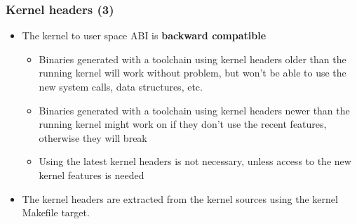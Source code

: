 \begin{frame}
  \frametitle{Kernel headers (3)}
  \begin{itemize}
  \item The kernel to user space ABI is {\bf backward compatible}
    \begin{itemize}
    \item Binaries generated with a toolchain using kernel headers
      older than the running kernel will work without problem, but
      won't be able to use the new system calls, data structures, etc.
    \item Binaries generated with a toolchain using kernel headers
      newer than the running kernel might work on if they don't use
      the recent features, otherwise they will break
    \item Using the latest kernel headers is not necessary, unless
      access to the new kernel features is needed
    \end{itemize}
  \item The kernel headers are extracted from the kernel sources using
    the  kernel Makefile target.
  \end{itemize}
\end{frame}

